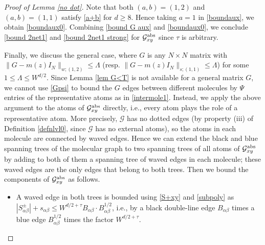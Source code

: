 \documentclass{article}
\newcommand{\1}{\mathds{1}}
\numberwithin{equation}{section}
\newcommand{\al}{\alpha}
\newcommand{\be}{\begin{equation}}
\newcommand{\ee}{\end{equation}}
\renewcommand{\cal}{\mathcal}
\renewcommand{\leq}{\leqslant}
\renewcommand{\geq}{\geqslant}
\renewcommand{\le}{\leq}
\renewcommand{\ge}{\geq}
\newcommand{\abs}{{\rm abs}}%
\DeclareMathOperator{\OO}{O}
\theoremstyle{plain} %
\newtheorem{claim}[theorem]{Claim}
\theoremstyle{remark}
\begin{document}
\begin{proof} [Proof of Lemma \ref{no dot}]


Note that both $(a,b)=(1,2)$ and $(a,b)=(1,1)$ satisfy \eqref{a+b} for $d\ge 8$. Hence taking $a=1$ in \eqref{boundaux}, we obtain \eqref{boundaux0}. Combining \eqref{bound G aux} and \eqref{boundaux0}, we conclude \eqref{bound 2net1} and \eqref{bound 2net1 strong} for $\cal G_{xy}^{\abs}$ since $\tau$ is arbitrary.

Finally, we discuss the general case, where $G$ is any $N\times N$ matrix with $\|G-m(z)I_N\|_{w;(1,2)}\le \Lambda$ (resp. $\|G-m(z)I_N\|_{s;(1,1)}\le \Lambda$) for some $1\le \Lambda\le W^{d/2}$. Since Lemma \ref{lem G<T} is not available for a general matrix $G$, we cannot use \eqref{Gpsi} to bound the $G$ edges between different molecules by $\Psi$ entries of the representative atoms as in \eqref{intermole1}. Instead, we apply the above argument to the atoms of $\cal G_{xy}^{\abs}$ directly, i.e., every atom plays the role of a representative atom. More precisely, $\cal G$ has no dotted edges (by property (iii) of Definition \ref{defnlvl0}, since $\cal G$ has no external atoms), so the atoms in each molecule are connected by waved edges. Hence we can extend the black and blue spanning trees of the molecular graph to two spanning trees of all atoms of $\cal G_{xy}^{\abs}$ by adding to both of them a spanning tree of waved edges in each molecule; these waved edges are the only edges that belong to both trees. Then we bound the components of $\cal G_{xy}^{\abs}$ as follows. 
\begin{itemize}
\item A waved edge in both trees is bounded using \eqref{S+xy} and \eqref{subpoly} as $|S^\pm_{\al\beta}|+s_{\al\beta}\le W^{d/2+\tau}B_{\al\beta}\cdot B^{1/2}_{\al\beta}$, i.e., by a black double-line edge $B_{\al\beta}$ times a blue edge $B^{1/2}_{\al\beta}$ times the factor $W^{d/2+\tau}$. 


\end{itemize}
\end{proof}
\end{document}
